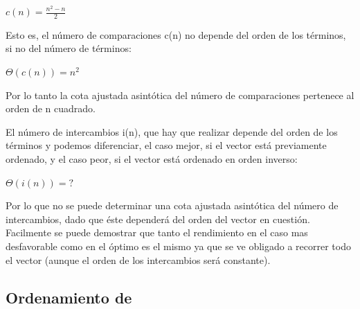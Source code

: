 \documentclass[8pt, A4]{article}    %
\begin{document}
\begin{center}
${\displaystyle c(n)={\frac {n^{2}-n}{2}}}$
\end{center}

Esto es, el número de comparaciones c(n) no depende del orden de los términos, si no del número de términos:

\begin{center}
${\displaystyle \Theta (c(n))=n^{2}\;}$
\end{center}

Por lo tanto la cota ajustada asintótica del número de comparaciones pertenece al orden de n cuadrado.

El número de intercambios i(n), que hay que realizar depende del orden de los términos y podemos diferenciar, el caso mejor, si el vector está previamente ordenado, y el caso peor, si el vector está ordenado en orden inverso:

\begin{center}
${\displaystyle \Theta (i(n))= ?\;}$
\end{center}

Por lo que no se puede determinar una cota ajustada asintótica del número de intercambios, dado que éste dependerá del orden del vector en cuestión.\\

Facilmente se puede demostrar que tanto el rendimiento en el caso mas desfavorable como en el óptimo es el mismo ya que se ve obligado a recorrer todo el vector (aunque el orden de los intercambios será constante).

\subsection{Ordenamiento de }
\end{document}

